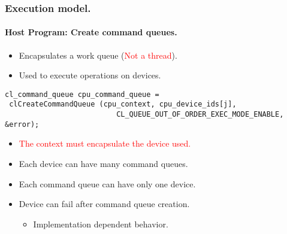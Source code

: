 \documentclass{beamer}
\begin{document}
\begin{frame}[fragile]
\frametitle{Execution model.}
\framesubtitle{Host Program: Create command queues.}

  \begin{itemize}
  \item Encapsulates a work queue (\textcolor{red}{Not a thread}).
  \item Used to execute operations on devices.
  \end{itemize}

\begin{center}
\begin{minipage}{0.8\textwidth}
  \begin{lstlisting}
cl_command_queue cpu_command_queue = 
 clCreateCommandQueue (cpu_context, cpu_device_ids[j], 
                          CL_QUEUE_OUT_OF_ORDER_EXEC_MODE_ENABLE, &error);
  \end{lstlisting}
\end{minipage}
\end{center}

  \begin{itemize}
  \item \textcolor{red}{The context must encapsulate the device used.}
  \item Each device can have many command queues.
  \item Each command queue can have only one device.
  \item Device can fail after command queue creation.
    \begin{itemize}
    \item Implementation dependent behavior.
    \end{itemize}
  \end{itemize}
\end{frame}
\end{document}
